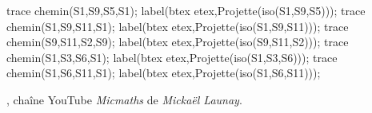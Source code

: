 \begin{changemargin}{-10mm}{-15mm}
\begin{debat}
\begin{center}
{\begin{Geometrie}[CoinBG={u*(-10,-10)},TypeTrace="Espace"]
         trace chemin(S1,S9,S5,S1);
         label(btex \Large{} etex,Projette(iso(S1,S9,S5)));
         trace chemin(S1,S9,S11,S1);
         label(btex \Large{} etex,Projette(iso(S1,S9,S11)));
         trace chemin(S9,S11,S2,S9);
         label(btex \Large{} etex,Projette(iso(S9,S11,S2)));
         trace chemin(S1,S3,S6,S1);
         label(btex \Large{} etex,Projette(iso(S1,S3,S6)));
         trace chemin(S1,S6,S11,S1);
         label(btex \Large{} etex,Projette(iso(S1,S6,S11)));
      \end{Geometrie}
      }
   \end{center}
   \begin{cadre}[B2][J4]
      \begin{center}
         , chaîne YouTube {\it Micmaths} de {\it Mickaël Launay}.
      \end{center}
   \end{cadre}
 \end{debat}
 \vspace*{-5mm}
\end{changemargin}